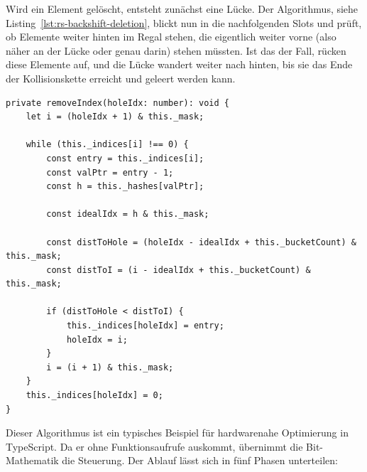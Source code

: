 Wird ein Element gelöscht, entsteht zunächst eine Lücke. Der Algorithmus, siehe Listing~\ref{lst:rs-backshift-deletion}, blickt nun in die nachfolgenden Slots und prüft, ob Elemente weiter hinten im Regal stehen, die eigentlich weiter vorne (also näher an der Lücke oder genau darin) stehen müssten. Ist das der Fall, rücken diese Elemente auf, und die Lücke wandert weiter nach hinten, bis sie das Ende der Kollisionskette erreicht und geleert werden kann.


\begin{listing}[H]
    \caption{Reparatur der Sondierungskette (Backshifting)}
    \label{lst:rs-backshift-deletion}
    \begin{verbatim}
private removeIndex(holeIdx: number): void {
    let i = (holeIdx + 1) & this._mask;
    
    while (this._indices[i] !== 0) {
        const entry = this._indices[i];
        const valPtr = entry - 1;
        const h = this._hashes[valPtr];
        
        const idealIdx = h & this._mask;
        
        const distToHole = (holeIdx - idealIdx + this._bucketCount) & this._mask;
        const distToI = (i - idealIdx + this._bucketCount) & this._mask;
        
        if (distToHole < distToI) {
            this._indices[holeIdx] = entry;
            holeIdx = i;
        }
        i = (i + 1) & this._mask;
    }
    this._indices[holeIdx] = 0;
}
    \end{verbatim}
\end{listing}

Dieser Algorithmus ist ein typisches Beispiel für hardwarenahe Optimierung in TypeScript. Da er ohne Funktionsaufrufe auskommt, übernimmt die Bit-Mathematik die Steuerung. Der Ablauf lässt sich in fünf Phasen unterteilen:

